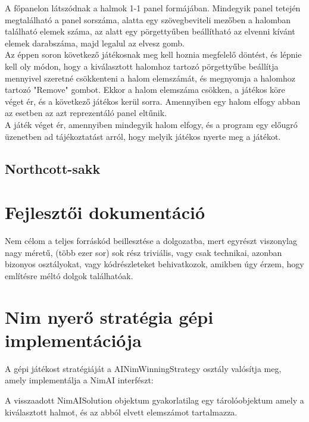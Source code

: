 A főpanelon látszódnak a halmok 1-1 panel formájában. Mindegyik panel tetején megtalálható a panel sorszáma, alatta egy szövegbeviteli mezőben a halomban található elemek száma, az alatt egy pörgettyűben beállítható az elvenni kívánt elemek darabszáma, majd legalul az elvesz gomb. \\

Az éppen soron következő játékosnak meg kell hoznia megfelelő döntést, és lépnie kell oly módon, hogy a kiválasztott halomhoz tartozó pörgettyűbe beállítja mennyivel szeretné csökkenteni a halom elemszámát, és megnyomja a halomhoz tartozó "Remove" gombot. Ekkor a halom elemszáma csökken, a játékos köre véget ér, és a következő játékos kerül sorra. Amennyiben egy halom elfogy abban az esetben az azt reprezentáló panel eltűnik.\\

A játék véget ér, amennyiben mindegyik halom elfogy, és a program egy előugró üzenetben ad tájékoztatást arról, hogy melyik játékos nyerte meg a játékot.

\subsection{Northcott-sakk}

\section{Fejlesztői dokumentáció}

Nem célom a teljes forráskód beillesztése a dolgozatba, mert egyrészt viszonylag nagy méretű, (több ezer sor) sok rész triviális, vagy csak technikai, azonban bizonyos osztályokat, vagy kódrészleteket behivatkozok, amikben úgy érzem, hogy említésre méltó dolgok találhatóak.

\section{Nim nyerő stratégia gépi implementációja}
A gépi játékost stratégiáját a AINimWinningStrategy osztály valósítja meg, amely implementálja a NimAI interfészt:


A visszaadott NimAISolution objektum gyakorlatilag egy tárolóobjektum amely a kiválasztott halmot, és az abból elvett elemszámot tartalmazza.


